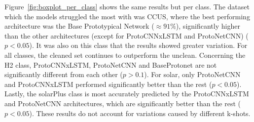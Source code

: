 \documentclass[11pt]{article}
\begin{document}
Figure~\ref{fig:boxplot_per_class} shows the same results but per class. The dataset which the models struggled the most with was CCUS, where the best performing architecture was the Base Prototypical Network ($\approx91\%$), significantly higher than the other architectures (except for ProtoCNNxLSTM and ProtoNetCNN) (\( p<0.05\)).
It was also on this class that the results showed greater variation. 
For all classes, the cleaned set continues to outperform the unclean. Concerning the H2 class, ProtoCNNxLSTM, ProtoNetCNN and BaseProtonet are not significantly different from each other (\( p>0.1\)). For solar, only ProtoNetCNN and ProtoCNNxLSTM performed significantly better than the rest (\( p<0.05\)).
Lastly, the solarPlus class is most accurately predicted by the ProtoCNNxLSTM and ProtoNetCNN architectures, which are significantly better than the rest (\( p<0.05\)). These results do not account for variations caused by different k-shots.

\begin{table}
  \centering
  \caption{Best performing model configuration for each dataset}
  \label{table:bestModels}
\end{table}
\end{document}
